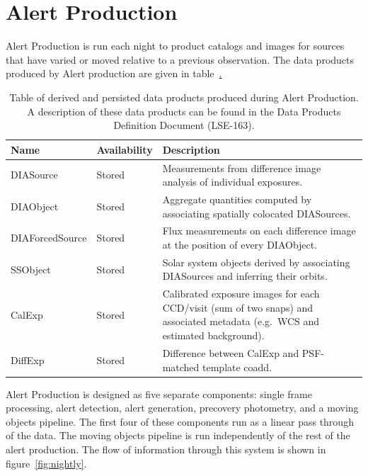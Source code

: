\section{Alert Production}
\label{sec:ap}



Alert Production is run each night to product catalogs and images for sources that have varied or moved relative to a previous observation.  The data products produced by Alert production are given in  table~\hyperref[table:ap_data_products].

\begin{table}
\small
\begin{tabularx}{\textwidth}{ | l | l | X | }
  \hline
  {\bf Name} & {\bf Availability} & {\bf Description} \\
  \hline
  DIASource & Stored &
  Measurements from difference image analysis of individual exposures. \\
  \hline
  DIAObject& Stored &
  Aggregate quantities computed by associating spatially colocated DIASources. \\
  \hline
  DIAForcedSource & Stored &
  Flux measurements on each difference image at the position of every DIAObject. \\
  \hline
  SSObject & Stored &
  Solar system objects derived by associating DIASources and inferring their orbits. \\
  \hline
  CalExp & Stored &
  Calibrated exposure images for each CCD/visit (sum of two snaps) and associated metadata (e.g.\ WCS and estimated background). \\
  \hline
  DiffExp & Stored &
  Difference between CalExp and PSF-matched template coadd. \\
  \hline
\end{tabularx}
\caption{Table of derived and persisted data products produced during  Alert Production.  A description of these data products can be found in the Data Products Definition Document (LSE-163).
\label{table:ap_data_products}}
\end{table}


Alert Production is designed as five separate components: single frame processing, alert detection, alert generation, precovery photometry, and a moving objects pipeline. The first four of these components run as a linear pass through of the data. The moving objects pipeline is run independently of the rest of the alert production. The flow of information through this system is shown in figure~\ref{fig:nightly}.

